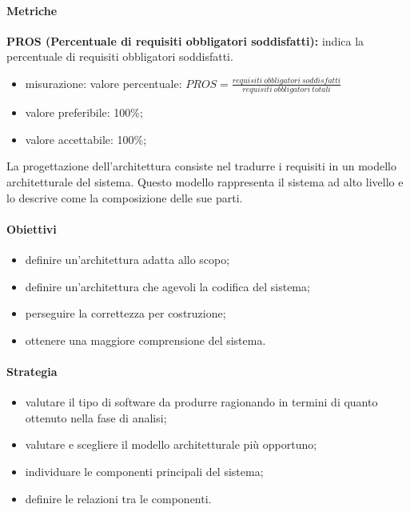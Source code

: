 \paragraph{Metriche}
\textbf{PROS (Percentuale di requisiti obbligatori soddisfatti):} indica la percentuale di requisiti obbligatori soddisfatti.
\begin{itemize}
    \item misurazione: valore percentuale: $PROS = \frac{requisiti \ obbligatori \ soddisfatti}{requisiti \ obbligatori \ totali}$
    \item valore preferibile: 100\%;
    \item valore accettabile: 100\%;
\end{itemize}
La progettazione dell'architettura consiste nel tradurre i requisiti in un modello architetturale del sistema. Questo modello rappresenta 
il sistema ad alto livello e lo descrive come la composizione delle sue parti.
\paragraph{Obiettivi}
\begin{itemize}
    \item definire un'architettura adatta allo scopo;
    \item definire un'architettura che agevoli la codifica del sistema;
    \item perseguire la correttezza per costruzione;
    \item ottenere una maggiore comprensione del sistema.
\end{itemize}
\paragraph{Strategia}
\begin{itemize}
    \item valutare il tipo di software da produrre ragionando in termini di quanto ottenuto nella fase di analisi;
    \item valutare e scegliere il modello architetturale più opportuno;
    \item individuare le componenti principali del sistema;
    \item definire le relazioni tra le componenti. 
\end{itemize}
